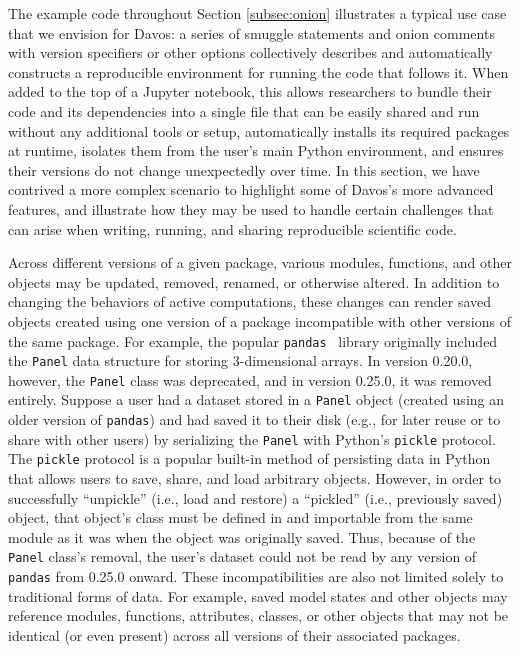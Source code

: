 \documentclass[preprint,12pt,a4paper]{elsarticle}
\begin{document}
The example code throughout Section \ref{subsec:onion} illustrates a typical use case that we envision for Davos: a series of smuggle statements and onion comments with version specifiers or other options collectively describes and automatically constructs a reproducible environment for running the code that follows it.
When added to the top of a Jupyter notebook, this allows researchers to bundle their code and its dependencies into a single file that can be easily shared and run without any additional tools or setup, automatically installs its required packages at runtime, isolates them from the user's main Python environment, and ensures their versions do not change unexpectedly over time.
In this section, we have contrived a more complex scenario to highlight some of Davos's more advanced features, and illustrate how they may be used to handle certain challenges that can arise when writing, running, and sharing reproducible scientific code.

Across different versions of a given package, various modules, functions,
and other objects may be updated, removed, renamed, or otherwise altered. In
addition to changing the behaviors of active computations, these changes can
render saved objects created using one version of a package incompatible with
other versions of the same package. For example, the popular
\texttt{pandas}~\cite{McKi10} library originally included the \texttt{Panel} data
structure for storing 3-dimensional arrays. In version 0.20.0, however, the
\texttt{Panel} class was deprecated, and in version 0.25.0, it was removed
entirely. Suppose a user had a dataset stored in a \texttt{Panel} object
(created using an older version of \texttt{pandas}) and had saved it to their
disk (e.g., for later reuse or to share with other users) by serializing the
\texttt{Panel} with Python's \texttt{pickle} protocol. The \texttt{pickle}
protocol is a popular built-in method of persisting data in Python that allows
users to save, share, and load arbitrary objects. However, in order to
successfully ``unpickle'' (i.e., load and restore) a ``pickled'' (i.e., previously saved)
object, that object's class must be defined in and importable from the same
module as it was when the object was originally saved. Thus, because of the \texttt{Panel} class's
removal, the user's dataset could not be read by any version of \texttt{pandas}
from 0.25.0 onward. These incompatibilities are also not limited solely to
traditional forms of data. For example, saved model states and other objects
may reference modules, functions, attributes, classes, or other objects that
may not be identical (or even present) across all versions of their associated
packages.
\end{document}
